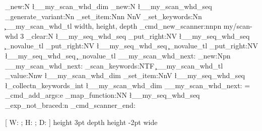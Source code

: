 \documentclass[openany]{book}
\begin{document}
\begin{examcode}[l3code]{}
\ExplSyntaxOn
\dim_new:N \l__my_scan_whd_dim %
\seq_new:N \l__my_scan_whd_seq %
\cs_generate_variant:Nn \seq_set_item:Nnn { NnV }
\collectn_set_keywords:Nn \c__my_scan_whd_tl { width, height, depth }
\ekeys_cmd_new_scanner:nnpn { my/scan-whd } { 3 }
  {
    \seq_clear:N \l__my_seq_whd_seq
    \seq_put_right:NV \l__my_seq_whd_seq \c_novalue_tl
    \seq_put_right:NV \l__my_seq_whd_seq \c_novalue_tl
    \seq_put_right:NV \l__my_seq_whd_seq \c_novalue_tl
    \__my_scan_whd_next: 
  }
\cs_new:Npn \__my_scan_whd_next: 
  {
    \collectn_scan_keywords:NTF \c__my_scan_whd_tl 
      {
        \collectn_value:Nnw \l__my_scan_whd_dim 
          {
            \seq_set_item:NnV \l__my_seq_whd_seq 
              { \l_collectn_keywords_int } \l__my_scan_whd_dim 
            \__my_scan_whd_next: 
          } = %
      }
      { 
        \ekeys_cmd_add_args:e
          { \seq_map_function:NN \l__my_seq_whd_seq \ekeys_exp_not_braced:n }
        \ekeys_cmd_scanner_end: 
      }
  }
\ExplSyntaxOff

\DeclareEKeysCommand {} 
  {[ W: ; H: ; D:  ]}
\ttfamily
\foo height 3pt depth \dimeval{3pt+2pt-10pt} height \dimexpr 3pt-2pt wide
\end{examcode}
\end{document}
